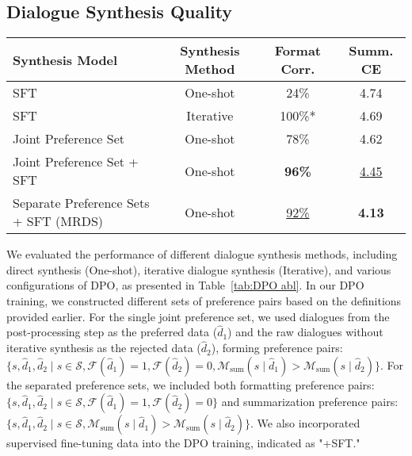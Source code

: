 \subsection{Dialogue Synthesis Quality}


\begin{table*}[htp]
\centering
\begin{tabular}{lccc}
\toprule
 \textbf{Synthesis Model} & \textbf{Synthesis Method} & \textbf{Format Corr.} & \textbf{Summ. CE} \\
\midrule
SFT  &  One-shot & 24\% & 4.74 \\
SFT & Iterative  & 100\%* & 4.69 \\
\midrule
Joint Preference Set  & One-shot &  78\% & 4.62 \\
Joint Preference Set + SFT  & One-shot &  \textbf{96\%} & \underline{4.45} \\
Separate Preference Sets + SFT (MRDS) & One-shot &  \underline{92\%} & \textbf{4.13} \\
\bottomrule
\end{tabular}
\caption{Dialouge Synthesis with different training strategy on SAMSum 300 shots experiments.}
\label{tab:DPO abl}
\end{table*}


We evaluated the performance of different dialogue synthesis methods, including direct synthesis (One-shot), iterative dialogue synthesis (Iterative), and various configurations of DPO, as presented in Table~\ref{tab:DPO abl}. In our DPO training, we constructed different sets of preference pairs based on the definitions provided earlier. For the single joint preference set, we used dialogues from the post-processing step as the preferred data (\( \hat{d}_1 \)) and the raw dialogues without iterative synthesis as the rejected data (\( \hat{d}_2 \)), forming preference pairs:
\(\{s, \hat{d}_1, \hat{d}_2 \mid s \in \mathcal{S}, \mathcal{F}(\hat{d}_1) = 1, \mathcal{F}(\hat{d}_2) = 0, \mathcal{M}_{\text{sum}}(s \mid \hat{d}_1) > \mathcal{M}_{\text{sum}}(s \mid \hat{d}_2)\}\). 
For the separated preference sets, we included both formatting preference pairs:
\(\{s, \hat{d}_1, \hat{d}_2 \mid s \in \mathcal{S}, \mathcal{F}(\hat{d}_1) = 1, \mathcal{F}(\hat{d}_2) = 0\}\)
and summarization preference pairs:
\(\{s, \hat{d}_1, \hat{d}_2 \mid s \in \mathcal{S}, \mathcal{M}_{\text{sum}}(s \mid \hat{d}_1) > \mathcal{M}_{\text{sum}}(s \mid \hat{d}_2)\}\). 
We also incorporated supervised fine-tuning data into the DPO training, indicated as "+SFT."

